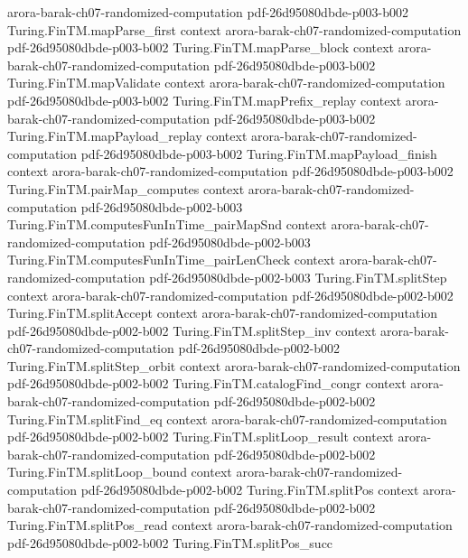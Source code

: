 \begin{theorem}
  {arora-barak-ch07-randomized-computation}
  {pdf-26d95080dbde-p003-b002}
\proofstep
  {Turing.FinTM.mapParse_first}
  {context}
  {arora-barak-ch07-randomized-computation}
  {pdf-26d95080dbde-p003-b002}
\proofstep
  {Turing.FinTM.mapParse_block}
  {context}
  {arora-barak-ch07-randomized-computation}
  {pdf-26d95080dbde-p003-b002}
\proofstep
  {Turing.FinTM.mapValidate}
  {context}
  {arora-barak-ch07-randomized-computation}
  {pdf-26d95080dbde-p003-b002}
\proofstep
  {Turing.FinTM.mapPrefix_replay}
  {context}
  {arora-barak-ch07-randomized-computation}
  {pdf-26d95080dbde-p003-b002}
\proofstep
  {Turing.FinTM.mapPayload_replay}
  {context}
  {arora-barak-ch07-randomized-computation}
  {pdf-26d95080dbde-p003-b002}
\proofstep
  {Turing.FinTM.mapPayload_finish}
  {context}
  {arora-barak-ch07-randomized-computation}
  {pdf-26d95080dbde-p003-b002}
\proofstep
  {Turing.FinTM.pairMap_computes}
  {context}
  {arora-barak-ch07-randomized-computation}
  {pdf-26d95080dbde-p002-b003}
\proofstep
  {Turing.FinTM.computesFunInTime_pairMapSnd}
  {context}
  {arora-barak-ch07-randomized-computation}
  {pdf-26d95080dbde-p002-b003}
\proofstep
  {Turing.FinTM.computesFunInTime_pairLenCheck}
  {context}
  {arora-barak-ch07-randomized-computation}
  {pdf-26d95080dbde-p002-b003}
\proofstep
  {Turing.FinTM.splitStep}
  {context}
  {arora-barak-ch07-randomized-computation}
  {pdf-26d95080dbde-p002-b002}
\proofstep
  {Turing.FinTM.splitAccept}
  {context}
  {arora-barak-ch07-randomized-computation}
  {pdf-26d95080dbde-p002-b002}
\proofstep
  {Turing.FinTM.splitStep_inv}
  {context}
  {arora-barak-ch07-randomized-computation}
  {pdf-26d95080dbde-p002-b002}
\proofstep
  {Turing.FinTM.splitStep_orbit}
  {context}
  {arora-barak-ch07-randomized-computation}
  {pdf-26d95080dbde-p002-b002}
\proofstep
  {Turing.FinTM.catalogFind_congr}
  {context}
  {arora-barak-ch07-randomized-computation}
  {pdf-26d95080dbde-p002-b002}
\proofstep
  {Turing.FinTM.splitFind_eq}
  {context}
  {arora-barak-ch07-randomized-computation}
  {pdf-26d95080dbde-p002-b002}
\proofstep
  {Turing.FinTM.splitLoop_result}
  {context}
  {arora-barak-ch07-randomized-computation}
  {pdf-26d95080dbde-p002-b002}
\proofstep
  {Turing.FinTM.splitLoop_bound}
  {context}
  {arora-barak-ch07-randomized-computation}
  {pdf-26d95080dbde-p002-b002}
\proofstep
  {Turing.FinTM.splitPos}
  {context}
  {arora-barak-ch07-randomized-computation}
  {pdf-26d95080dbde-p002-b002}
\proofstep
  {Turing.FinTM.splitPos_read}
  {context}
  {arora-barak-ch07-randomized-computation}
  {pdf-26d95080dbde-p002-b002}
\proofstep
  {Turing.FinTM.splitPos_succ}

\end{theorem}
